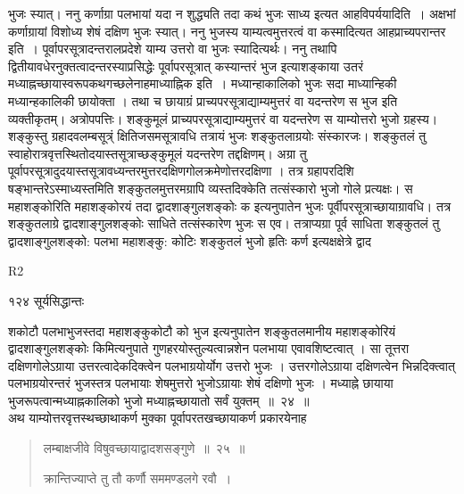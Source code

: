 \documentclass[11pt, openany]{book}
\begin{document}
\begin{sloppypar}
\noindent भुजः स्यात्। ननु कर्णाग्रा पलभायां यदा न शुद्ध्यति तदा कथं भुजः साध्य इत्यत आह\textendash विपर्ययादिति~। अक्षभां कर्णाग्रायां विशोध्य शेषं दक्षिण भुजः स्यात्। ननु भुजस्य याम्यत्वमुत्तरत्वं वा कस्मादित्यत आह\textendash प्राच्यपरान्तर इति~। पूर्वापरसूत्रादन्तरालप्रदेशे याम्य उत्तरो वा भुजः स्यादित्यर्थः। ननु तथापि द्वितीयावधेरनुक्तत्वादन्तरस्याप्रसिद्धेः पूर्वापरसूत्रात् कस्यान्तरं भुज इत्याशङ्काया उतरं मध्याह्नच्छायास्वरूपकथगच्छलेनाह\textendash माध्याह्निक इति~। मध्यान्हाकालिको भुजः सदा माध्यान्हिकी मध्यान्हकालिकी छायोक्ता । तथा च छायाग्रं प्राच्यपरसूत्राद्याम्यमुत्तरं वा यदन्तरेण स भुज इति व्यक्तीकृतम्। अत्रोपपत्तिः। शङ्कुमूलं प्राच्यपरसूत्राद्याम्यमुत्तरं वा यदन्तरेण स याम्योत्तरो भुजो ग्रहस्य। शङ्कुस्तु ग्रहादवलम्बसूत्र्ं क्षितिजसमसूत्रावधि तत्रायं भुजः शङ्कुतलाग्रयोः संस्कारजः। शङ्कुतलं तु स्वाहोरात्रवृत्तस्थितोदयास्तसूत्राच्छङ्कुमूलं यदन्तरेण तद्दक्षिणम्। अग्रा तु पूर्वापरसूत्रादुदयास्तसूत्रावध्यन्तरमुत्तरदक्षिणगोलक्रमेणोत्तरदक्षिणा । तत्र ग्रहापरदिशि षङ्भान्तरेऽस्माध्यस्तमिति शङ्कुतलमुत्तरमग्रापि व्यस्तदिक्केति तत्संस्कारो भुजो गोले प्रत्यक्षः। स महाशङ्कोरिति महाशङ्कोरयं तदा द्वादशाङ्गुलशङ्कोः क इत्यनुपातेन भुजः पूर्वीपरसूत्राच्छायाग्रावधि। तत्र शङ्कुतलाग्रे द्वादशाङ्गुलशङ्कोः साधिते तत्संस्कारेण भुजः स एव। तत्राप्यग्रा पूर्व साधिता शङ्कुतलं तु द्वादशाङ्गुलशङ्को: पलभा महाशङ्कु: कोटिः शङ्कुतलं भुजो हृतिः कर्ण इत्यक्षक्षेत्रे द्वाद\textendash
\end{sloppypar}

{\tiny{R2}}


\newpage


\noindent १२४ \hspace{4cm} सूर्यसिद्धान्तः
\vspace{1cm}

\begin{sloppypar}
\noindent शकोटौ पलभाभुजस्तदा महाशङ्कुकोटौ को भुज इत्यनुपातेन शङ्कुतलमानीय महाशङ्कोरियं द्वादशाङ्गुलशङ्कोः किमित्यनुपाते गुणहरयोस्तुल्यत्वान्नशेन पलभाया एवावशिष्टत्वात् । सा तूत्तरा दक्षिणगोलेऽग्राया उत्तरत्वादेकदिक्त्वेन पलभाग्रयोर्योग उत्तरो भुजः । उत्तरगोलेऽग्राया दक्षिणत्वेन भिन्नदिक्त्वात् पलभाग्रयोरन्तरं भुजस्तत्र पलभायाः शेषमुत्तरो भुजोऽग्रायाः शेषं दक्षिणो भुजः । मध्याह्ने छायाया भुजरूपत्वान्मध्याह्नकालिको भुजो मध्याह्नच्छायातो सर्वं युक्तम्~॥~२४~॥\\
\noindent अथ याम्योत्तरवृत्तस्थच्छाथाकर्ण मुक्का पूर्वापरतखच्छायाकर्ण प्रकारयेनाह\textendash
\end{sloppypar}
\begin{quote}

  {\ssi लम्बाक्षजीवे विषुवच्छायाद्वादशसङ्गुणे~॥~२५~॥

 क्रान्तिज्याप्ते तु तौ कर्णौ सममण्डलगे रवौ~।}
 \end{quote}
\end{document}
